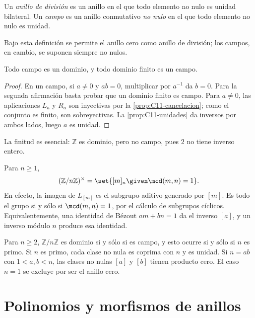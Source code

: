 \begin{defi}
Un \emph{anillo de división} es un anillo en el que todo elemento no nulo es unidad bilateral. Un \emph{campo} es un anillo conmutativo \emph{no nulo} en el que todo elemento no nulo es unidad.
\end{defi}
Bajo esta definición se permite el anillo cero como anillo de división; los campos, en cambio, se suponen siempre no nulos.

\begin{prop}\label{prop:C11-finito}
Todo campo es un dominio, y todo dominio finito es un campo.
\end{prop}
\begin{proof}
En un campo, si $a\ne0$ y $ab=0$, multiplicar por $a^{-1}$ da $b=0$. Para la segunda afirmación basta probar que un dominio finito es campo. Para $a\ne0$, las aplicaciones $L_a$ y $R_a$ son inyectivas por la \cref{prop:C11-cancelacion}; como el conjunto es finito, son sobreyectivas. La \cref{prop:C11-unidades} da inversos por ambos lados, luego $a$ es unidad.
\end{proof}
La finitud es esencial: $\mathbb Z$ es dominio, pero no campo, pues $2$ no tiene inverso entero.

\begin{ejem}
Para $n\geq1$,
\[
(\mathbb Z/n\mathbb Z)^\times
=\set{[m]_n\given \mcd(m,n)=1}.
\]
En efecto, la imagen de $L_{[m]}$ es el subgrupo aditivo generado por $[m]$. Es todo el grupo si y sólo si $\mcd(m,n)=1$, por el cálculo de subgrupos cíclicos. Equivalentemente, una identidad de Bézout $am+bn=1$ da el inverso $[a]$, y un inverso módulo $n$ produce esa identidad.

Para $n\geq2$, $\mathbb Z/n\mathbb Z$ es dominio si y sólo si es campo, y esto ocurre si y sólo si $n$ es primo. Si $n$ es primo, cada clase no nula es coprima con $n$ y es unidad. Si $n=ab$ con $1<a,b<n$, las clases no nulas $[a]$ y $[b]$ tienen producto cero. El caso $n=1$ se excluye por ser el anillo cero.
\end{ejem}

\section{Polinomios y morfismos de anillos}
